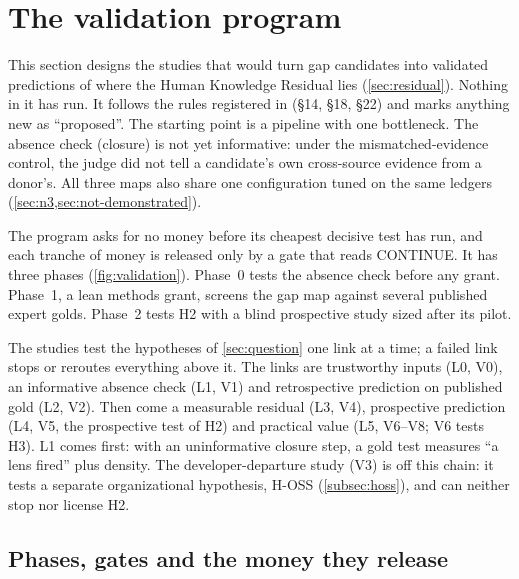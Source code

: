 \section{The validation program}\label{sec:validation}

This section designs the studies that would turn gap candidates into validated predictions of
where the Human Knowledge Residual lies (\cref{sec:residual}). \evfut{} Nothing in it has run. It
follows the rules registered in  (§14, §18, §22) and marks anything new as
\enquote{proposed}. \evobs{} The starting point is a pipeline with one bottleneck. The absence
check (closure) is not yet informative: under the mismatched-evidence control, the judge did not
tell a candidate's own cross-source evidence from a donor's. All three maps also share one configuration tuned on the same ledgers
(\cref{sec:n3,sec:not-demonstrated}).

The program asks for no money before its cheapest decisive test has run, and each tranche of money
is released only by a gate that reads CONTINUE. It has three phases (\cref{fig:validation}).
Phase~0 tests the absence check before any grant. Phase~1, a lean methods grant, screens the gap
map against several published expert golds. Phase~2 tests H2 with a blind prospective study
sized after its pilot.

The studies test the hypotheses of \cref{sec:question} one link at a time; a failed link stops or
reroutes everything above it. The links are trustworthy inputs (L0, V0), an informative absence
check (L1, V1) and retrospective prediction on published gold (L2, V2). Then come a measurable
residual (L3, V4), prospective prediction (L4, V5, the prospective test of H2) and practical value (L5,
V6--V8; V6 tests H3).
\evint{} L1 comes first: with an uninformative closure step, a gold test measures \enquote{a lens
fired} plus density. The developer-departure study (V3) is off this chain: it tests a separate
organizational hypothesis, H-OSS (\cref{subsec:hoss}), and can neither stop nor license H2.

\subsection{Phases, gates and the money they release}

